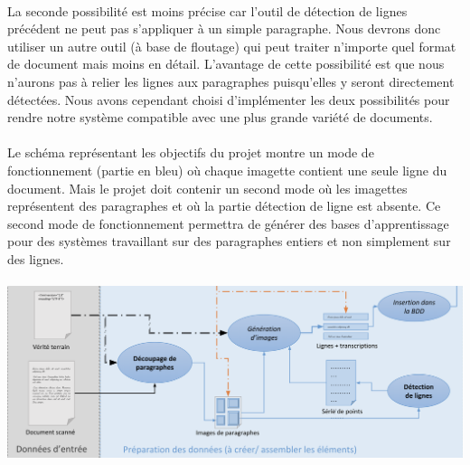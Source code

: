 \paragraph{}
La seconde possibilité est moins précise car l’outil de détection de lignes précédent ne peut pas s’appliquer
à un simple paragraphe. Nous devrons donc utiliser un autre outil (à base de floutage) qui peut traiter n’importe
quel format de document mais moins en détail. L’avantage de cette possibilité est que nous n’aurons pas à relier
les lignes aux paragraphes puisqu’elles y seront directement détectées. Nous avons cependant choisi d’implémenter
les deux possibilités pour rendre notre système compatible avec une plus grande variété de documents.

\paragraph{}
Le schéma représentant les objectifs du projet montre un mode de fonctionnement (partie en bleu) où
chaque imagette contient une seule ligne du document. Mais le projet doit contenir un second mode où
les imagettes représentent des paragraphes et où la partie détection de ligne est absente. Ce second
mode de fonctionnement permettra de générer des bases d’apprentissage pour des systèmes travaillant
sur des paragraphes entiers et non simplement sur des lignes. 

\paragraph{}
\begin{mdframed}[frametitle={Figure 4 : Partie traitement des données du projet (avec détection de lignes)}, innerbottommargin=10]
\begin{center}
\includegraphics[width=\linewidth]{detection.png}
\end{center}
\end{mdframed}

